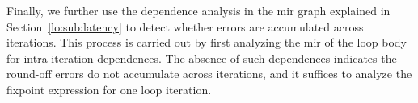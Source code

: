 Finally, we further use the dependence analysis in the \gls{mir} graph
explained in Section~\ref{lo:sub:latency} to detect whether errors are
accumulated across iterations.  This process is carried out by first analyzing
the \gls{mir} of the loop body for intra-iteration dependences.  The absence
of such dependences indicates the round-off errors do not accumulate across
iterations, and it suffices to analyze the fixpoint expression for one loop
iteration.
